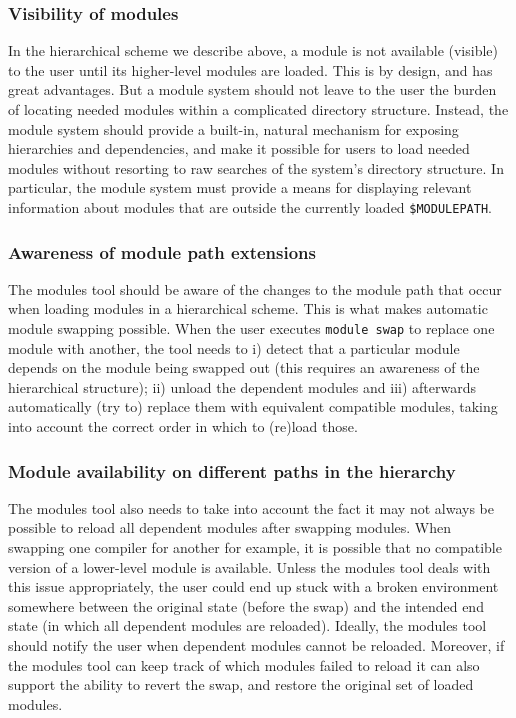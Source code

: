 \subsubsection{Visibility of modules}
\label{sec:hierarchical_consequences_visibility}

In the hierarchical scheme we describe above, a module is not available (visible)
to the user until its higher-level modules are loaded.  This
is by design, and has great advantages. But a module system should not leave to the
user the burden of locating needed modules within a complicated directory structure.  Instead, the module system should provide a built-in, natural mechanism for exposing hierarchies and
dependencies, and make it possible for users to load needed modules
without resorting to raw searches of the system's directory structure. In particular, the module system must provide a means for
displaying relevant information about modules that are outside the 
currently loaded \texttt{\small \$MODULEPATH}.

\subsubsection{Awareness of module path extensions}
\label{sec:hierarchical_consequences_extensions}

The modules tool should be aware of the changes  to the module path that
occur when loading modules in a hierarchical scheme. This is what makes
automatic module swapping possible. When the user executes \texttt{\small module swap} to replace one module with another, the tool needs to i) detect that a particular
module depends on the module being swapped out (this requires an awareness of
the hierarchical structure); ii) unload the dependent
modules and iii) afterwards
automatically (try to) replace them with equivalent compatible modules, taking into
account the correct order in which to (re)load those.

\subsubsection{Module availability on different paths in the hierarchy}
\label{sec:hierarchical_consequences_availability}

The modules tool also needs to take into account the fact it may not always be
possible to reload all dependent modules after swapping modules. When swapping
one compiler for another for example, it is possible that no compatible version of a
lower-level module is available. Unless the modules tool deals with this issue
appropriately, the user could end up stuck with a broken environment somewhere between
the original state (before the swap) and the intended end state (in which all
dependent modules are reloaded). Ideally, the modules tool should notify the user
when dependent modules cannot be reloaded. Moreover, if the modules tool can keep
track of which modules failed to reload it can also support the ability to revert
the swap, and restore the original set of loaded modules.

